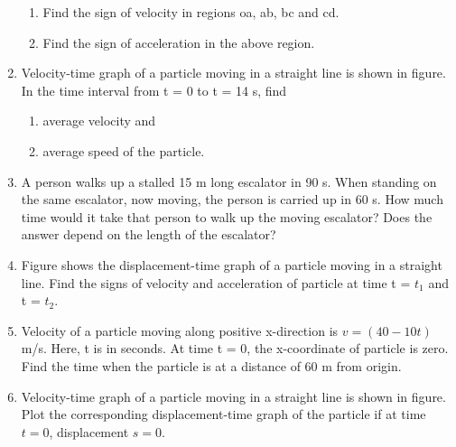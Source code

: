 \documentclass{article}
\begin{document}
\begin{enumerate}
    \begin{enumerate}
        \item Find the sign of velocity in regions oa, ab, bc and cd.
        \item Find the sign of acceleration in the above region.
    \end{enumerate}
    \item Velocity-time graph of a particle moving in a straight line is shown in figure. In the time interval from t = 0 to t = 14 s, find
    \begin{enumerate}
        \item average velocity and
        \item average speed of the particle.
    \end{enumerate}
    \item A person walks up a stalled 15 m long escalator in 90 s. When standing on the same escalator, now moving, the person is carried up in 60 s. How much time would it take that person to walk up the moving escalator? Does the answer depend on the length of the escalator?
    \item Figure shows the displacement-time graph of a particle moving in a straight line. Find the signs of velocity and acceleration of particle at time t = $t_1$ and t = $t_2$.
    \begin{center}
    \end{center}
    \item Velocity of a particle moving along positive x-direction is $v = (40 - 10t)$ m/s. Here, t is in seconds. At time t = 0, the x-coordinate of particle is zero. Find the time when the particle is at a distance of 60 m from origin.



\item Velocity-time graph of a particle moving in a straight line is shown in figure. Plot the corresponding displacement-time graph of the particle if at time \( t = 0 \), displacement \( s = 0 \).

\begin{center}
\end{center}


\end{enumerate}
\end{document}
